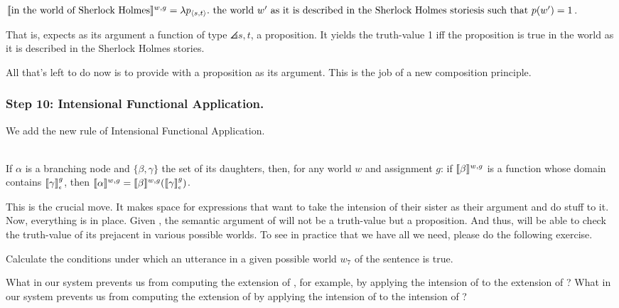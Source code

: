 \ex $\llbracket \mbox{in the world of Sherlock Holmes} \rrbracket^{w,g} =\\
\lambda p_{\langle s,t \rangle}.\ \mbox{the world } w' \mbox{ as it is described in the Sherlock Holmes stories}\\
\mbox{is such that } p(w') = 1$. \xe

That is,  expects as its argument a
function of type $\angles{s,t}$, a proposition. It yields the truth-value 1 iff
the proposition is true in the world as it is described in the Sherlock Holmes
stories.

All that's left to do now is to provide  with a proposition as its argument. This is the job of a new
composition principle.

\subsubsection{Step 10: Intensional Functional Application.} \label{sec:intens-funct-appl}

We add the new rule of Intensional Functional Application.

\ex {}\\
If $\alpha$ is a branching node and $\{\beta, \gamma\}$ the set of its
daughters, then, for any world $w$ and assignment $g$: if $\llbracket \beta \rrbracket^{w,g}$ is
a function whose domain contains $\svcent{\gamma}^g$, then $\sv{\alpha}^{w,g} =
\sv{\beta}^{w,g} (\svcent{\gamma}^g)$. \xe

This is the crucial move. It makes space for expressions that want to take the
intension of their sister as their argument and do stuff to it. Now, everything
is in place. Given \blastx, the semantic argument of  will not be a truth-value but a proposition. And thus,
 will be able to check the
truth-value of its prejacent in various possible worlds. To see in practice that
we have all we need, please do the following exercise.

\begin{exercise}
  Calculate the conditions under which an utterance in a given possible world
  $w_7$ of the sentence  is true. \eex
\end{exercise}

\begin{exercise}
  What in our system prevents us from computing the extension of
  , for example, by applying the intension of
   to the extension of ? What in our system
  prevents us from computing the extension of  by
  applying the intension of  to the intension of
  ? \eex
\end{exercise}

